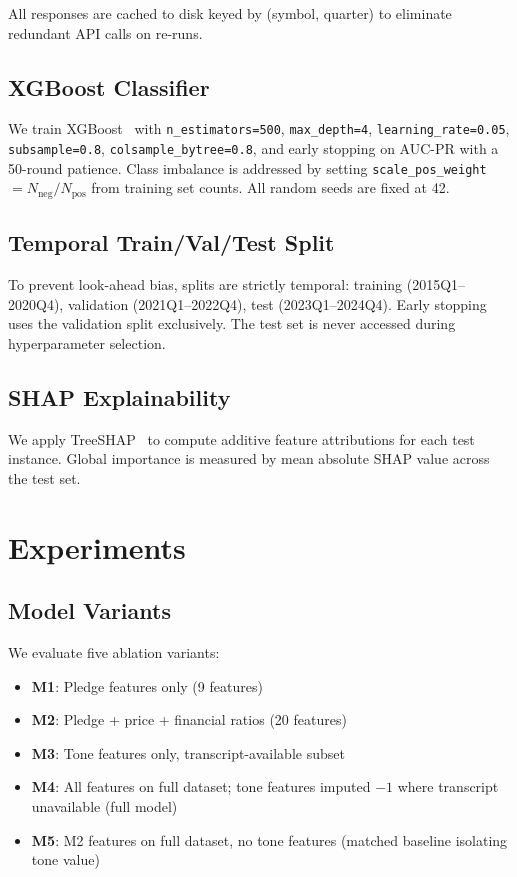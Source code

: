 \documentclass[conference]{IEEEtran}
\begin{document}
All responses are cached to disk keyed by (symbol, quarter) to eliminate
redundant API calls on re-runs.

\subsection{XGBoost Classifier}
We train XGBoost~\cite{chen2016xgboost} with
\texttt{n\_estimators=500}, \texttt{max\_depth=4},
\texttt{learning\_rate=0.05}, \texttt{subsample=0.8},
\texttt{colsample\_bytree=0.8}, and early stopping on AUC-PR with a
50-round patience. Class imbalance is addressed by setting
\texttt{scale\_pos\_weight} $= N_{\text{neg}} / N_{\text{pos}}$
from training set counts. All random seeds are fixed at 42.

\subsection{Temporal Train/Val/Test Split}
To prevent look-ahead bias, splits are strictly temporal:
training (2015Q1--2020Q4), validation (2021Q1--2022Q4), test
(2023Q1--2024Q4). Early stopping uses the validation split exclusively.
The test set is never accessed during hyperparameter selection.

\subsection{SHAP Explainability}
We apply TreeSHAP~\cite{lundberg2017shap} to compute additive feature
attributions for each test instance. Global importance is measured by
mean absolute SHAP value across the test set.

\section{Experiments}

\subsection{Model Variants}
We evaluate five ablation variants:
\begin{itemize}
  \item \textbf{M1}: Pledge features only (9 features)
  \item \textbf{M2}: Pledge + price + financial ratios (20 features)
  \item \textbf{M3}: Tone features only, transcript-available subset
  \item \textbf{M4}: All features on full dataset; tone features imputed $-1$ where transcript unavailable (full model)
  \item \textbf{M5}: M2 features on full dataset, no tone features (matched baseline isolating tone value)
\end{itemize}
\end{document}
